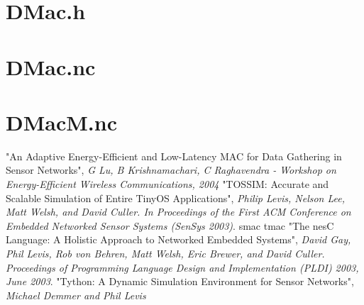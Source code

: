 \documentclass[twoside,11pt,a4paper,italian,openany]{book}
\begin{document}
\section{DMac.h}

\section{DMac.nc}

\section{DMacM.nc}


%
%
%
%


\backmatter
\begin{thebibliography}{99}
 "An Adaptive Energy-Efficient and Low-Latency MAC for Data Gathering in Sensor Networks", \emph{G Lu, B Krishnamachari, C Raghavendra - Workshop on Energy-Efficient Wireless Communications, 2004} 
 "TOSSIM: Accurate and Scalable Simulation of Entire TinyOS Applications", \emph{Philip Levis, Nelson Lee, Matt Welsh, and David Culler. In Proceedings of the First ACM Conference on Embedded Networked Sensor Systems (SenSys 2003)}.  
 smac
 tmac
 "The nesC Language: A Holistic Approach to Networked Embedded Systems", \emph{David Gay, Phil Levis, Rob von Behren, Matt Welsh, Eric Brewer, and David Culler. Proceedings of Programming Language Design and Implementation (PLDI) 2003, June 2003}.
 "Tython: A Dynamic Simulation Environment for Sensor Networks", \emph{Michael Demmer and Phil Levis}
\end{thebibliography}
\end{document}
